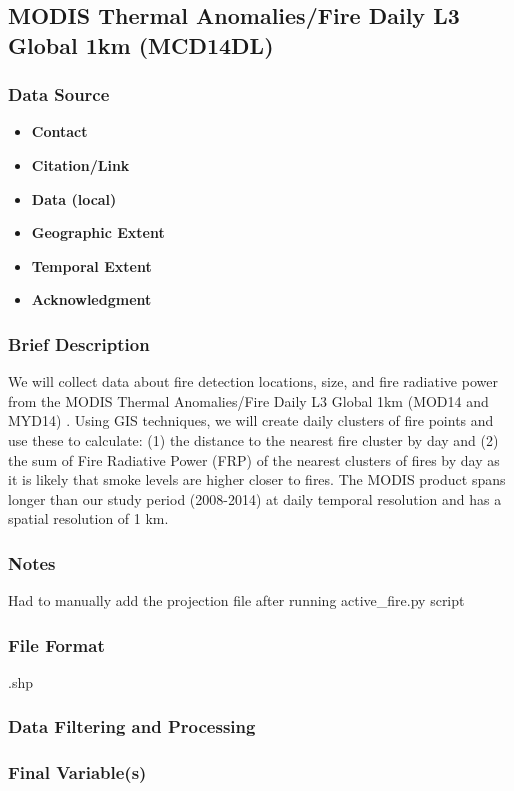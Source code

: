\subsection{MODIS Thermal Anomalies/Fire Daily L3 Global 1km (MCD14DL)}
\subsubsection*{Data Source}
\begin{itemize}[nolistsep]
\item \textbf{Contact}
\item \textbf{Citation/Link}
\item \textbf{Data (local)}
\item \textbf{Geographic Extent}
\item \textbf{Temporal Extent}
\item \textbf{Acknowledgment}
\end{itemize}
\subsubsection*{Brief Description}

We will collect data about fire detection locations, size, and fire radiative power from the MODIS Thermal Anomalies/Fire Daily L3 Global 1km (MOD14 and MYD14) \citep{Giglio2006,Hawbaker2017}. 
Using GIS techniques, we will create daily clusters of fire points and use these to calculate: (1) the distance to the nearest fire cluster by day and (2) the sum of Fire Radiative Power (FRP) of the nearest clusters of fires by day as it is likely that smoke levels are higher closer to fires. The MODIS product spans longer than our study period (2008-2014) at daily temporal resolution and has a spatial resolution of 1 km.

\subsubsection*{Notes}
Had to manually add the projection file after running active\_fire.py script

\subsubsection*{File Format} .shp
\subsubsection*{Data Filtering and Processing}
\subsubsection*{Final Variable(s)}
